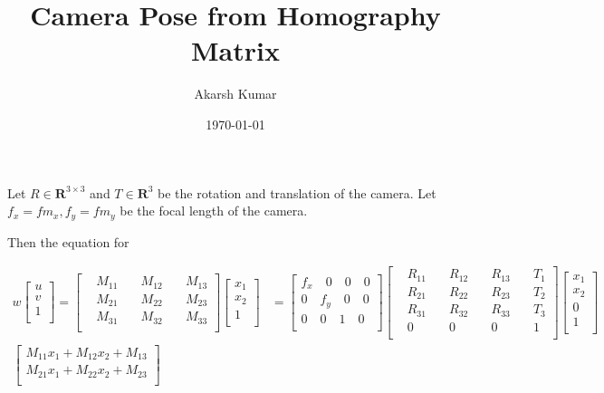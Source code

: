 \documentclass{article}
\title{Camera Pose from Homography Matrix}
\author{Akarsh Kumar}
\date\today
\begin{document}
\maketitle

Let $R\in \textbf{R}^{3\times 3}$ and $T\in \textbf{R}^3$ be the rotation and translation of the camera. Let $f_x=fm_x, f_y=fm_y$ be the focal length of the camera.

Then the equation for 

\begin{align*}
w
\begin{bmatrix}
u\\
v\\
1\\
\end{bmatrix}
=
\begin{bmatrix}
&M_{11}\quad &M_{12}\quad &M_{13}\\
&M_{21}\quad &M_{22}\quad &M_{23}\\
&M_{31}\quad &M_{32}\quad &M_{33}\\
\end{bmatrix}
\begin{bmatrix}
x_1\\
x_2\\
1\\
\end{bmatrix}
&=
\begin{bmatrix}
f_x\quad 0\quad 0\quad 0\\
0\quad f_y\quad 0\quad 0\\
0\quad 0\quad 1\quad 0\\
\end{bmatrix}
\begin{bmatrix}
&R_{11}\quad &R_{12}\quad &R_{13}\quad &T_1\\
&R_{21}\quad &R_{22}\quad &R_{23}\quad &T_2\\
&R_{31}\quad &R_{32}\quad &R_{33}\quad &T_3\\
&0\quad &0\quad &0\quad &1\\
\end{bmatrix}
\begin{bmatrix}
x_1\\
x_2\\
0\\
1\\
\end{bmatrix}\\
\begin{bmatrix}
M_{11}x_1+M_{12}x_2+M_{13}\\
M_{21}x_1+M_{22}x_2+M_{23}\\

\end{bmatrix}
\end{align*}
\end{document}
